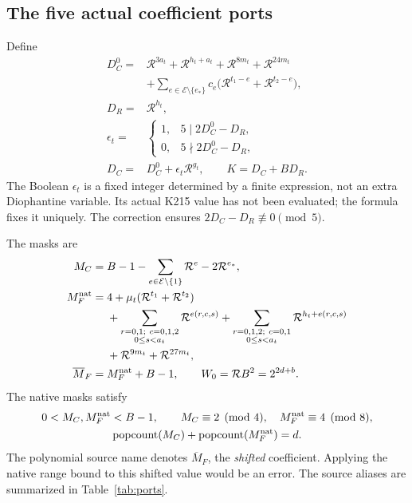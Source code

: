 \documentclass[11pt,a4paper]{article}
\theoremstyle{definition}\newtheorem{definition}[theorem]{Definition}
\newcommand{\pc}{\operatorname{popcount}}
\newcommand{\MF}{\overline M_F}
\newcommand{\file}[1]{\texttt{\detokenize{#1}}}
\begin{document}
\subsection{The five actual coefficient ports}
Define
\begin{align*}
 D_C^0={}&\mathcal R^{3a_t}+\mathcal R^{h_t+a_t}
       +\mathcal R^{8m_t}+\mathcal R^{24m_t}\\
 &+\sum_{e\in\mathcal E\setminus\{e_*\}}
 c_e\bigl(\mathcal R^{t_1-e}+\mathcal R^{t_2-e}\bigr),\\
 D_R={}&\mathcal R^{h_t},\\
 \epsilon_t={}&\begin{cases}
 1,&5\mid 2D_C^0-D_R,\\
 0,&5\nmid 2D_C^0-D_R,
 \end{cases}\\
 D_C={}&D_C^0+\epsilon_t\mathcal R^{g_t},\qquad K=D_C+BD_R.
\end{align*}
The Boolean $\epsilon_t$ is a fixed integer determined by a finite
expression, not an extra Diophantine variable. Its actual K215 value
has not been evaluated; the formula fixes it uniquely. The correction
ensures $2D_C-D_R\not\equiv0\pmod5$.

The masks are
\begin{align*}
 M_C={}&B-1-\sum_{e\in\mathcal E\setminus\{1\}}\mathcal R^e
             -2\mathcal R^{e_*},\\
 M_F^{\rm nat}={}&4+\mu_t(\mathcal R^{t_1}+\mathcal R^{t_2})\\
 &+\sum_{\substack{r=0,1;\ c=0,1,2\\0\le s<a_t}}
                  \mathcal R^{e(r,c,s)}
 +\sum_{\substack{r=0,1,2;\ c=0,1\\0\le s<a_t}}
                  \mathcal R^{h_t+e(r,c,s)}\\
 &+\mathcal R^{9m_t}+\mathcal R^{27m_t},\\
 \MF={}&M_F^{\rm nat}+B-1,\qquad
 W_0=\mathcal R B^2=2^{2d+b}.
\end{align*}
The native masks satisfy
\begin{gather*}
 0<M_C,M_F^{\rm nat}<B-1,\qquad
 M_C\equiv2\pmod4,\quad M_F^{\rm nat}\equiv4\pmod8,\\
 \pc(M_C)+\pc(M_F^{\rm nat})=d.
\end{gather*}
The polynomial source name \file{MF} denotes $\MF$, the \emph{shifted}
coefficient. Applying the native range bound to this shifted value
would be an error. The source aliases are summarized in
Table~\ref{tab:ports}.
\end{document}
